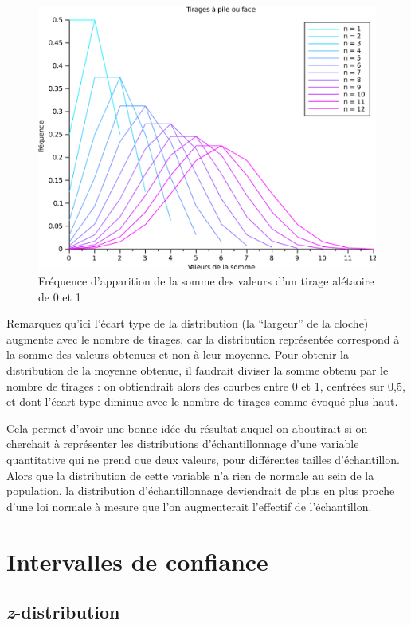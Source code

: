 \documentclass[
]{book}
\begin{document}
\begin{figure}
\centering
\includegraphics{images/tcl.png}
\caption{Fréquence d'apparition de la somme des valeurs d'un tirage alétaoire de 0 et 1}
\end{figure}

Remarquez qu'ici l'écart type de la distribution (la ``largeur'' de la cloche) augmente avec le nombre de tirages, car la distribution représentée correspond à la somme des valeurs obtenues et non à leur moyenne. Pour obtenir la distribution de la moyenne obtenue, il faudrait diviser la somme obtenu par le nombre de tirages : on obtiendrait alors des courbes entre 0 et 1, centrées sur 0,5, et dont l'écart-type diminue avec le nombre de tirages comme évoqué plus haut.

Cela permet d'avoir une bonne idée du résultat auquel on aboutirait si on cherchait à représenter les distributions d'échantillonnage d'une variable quantitative qui ne prend que deux valeurs, pour différentes tailles d'échantillon. Alors que la distribution de cette variable n'a rien de normale au sein de la population, la distribution d'échantillonnage deviendrait de plus en plus proche d'une loi normale à mesure que l'on augmenterait l'effectif de l'échantillon.

\hypertarget{intervalles-de-confiance}{%
\section{Intervalles de confiance}\label{intervalles-de-confiance}}

\hypertarget{z-distribution}{%
\subsection{\texorpdfstring{\emph{z}-distribution}{z-distribution}}\label{z-distribution}}
\end{document}
